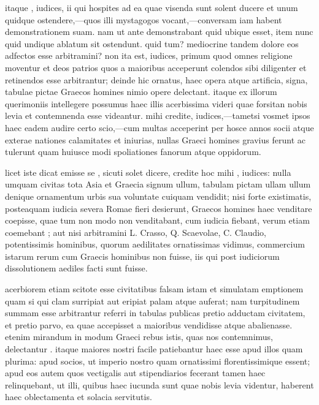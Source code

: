  itaque , iudices, ii qui hospites ad ea quae visenda sunt solent ducere et unum quidque ostendere,—quos illi mystagogos vocant,—conversam iam habent demonstrationem suam. nam ut ante demonstrabant quid ubique esset, item nunc quid undique ablatum sit ostendunt. quid tum? mediocrine tandem dolore eos adfectos esse arbitramini? non ita est, iudices, primum quod omnes religione moventur et deos patrios quos a maioribus acceperunt colendos sibi diligenter et retinendos esse arbitrantur; deinde hic ornatus, haec opera atque artificia, signa, tabulae pictae Graecos homines nimio opere delectant. itaque ex illorum querimoniis intellegere possumus haec illis acerbissima videri quae forsitan nobis levia et contemnenda esse videantur. mihi credite, iudices,—tametsi vosmet ipsos haec eadem audire certo scio,—cum multas acceperint per hosce annos socii atque exterae nationes calamitates et iniurias, nullas Graeci homines gravius ferunt ac tulerunt quam huiusce modi spoliationes fanorum atque oppidorum.

 licet iste dicat emisse se , sicuti solet dicere, credite hoc mihi , iudices: nulla umquam civitas tota Asia et Graecia signum ullum, tabulam pictam ullam ullum denique ornamentum urbis sua voluntate cuiquam vendidit; nisi forte existimatis, posteaquam iudicia severa Romae fieri desierunt, Graecos homines haec venditare coepisse, quae tum non modo non venditabant, cum iudicia fiebant, verum etiam coemebant ; aut nisi arbitramini L. Crasso, Q. Scaevolae, C. Claudio, potentissimis hominibus, quorum aedilitates ornatissimas vidimus, commercium istarum rerum cum Graecis hominibus non fuisse, iis qui post iudiciorum dissolutionem aediles facti sunt fuisse.

 acerbiorem etiam scitote esse civitatibus falsam istam et simulatam emptionem quam si qui clam surripiat aut eripiat palam atque auferat; nam turpitudinem summam esse arbitrantur referri in tabulas publicas pretio adductam civitatem, et pretio parvo, ea quae accepisset a maioribus vendidisse atque abalienasse. etenim mirandum in modum Graeci rebus istis, quas nos contemnimus, delectantur . itaque maiores nostri facile patiebantur haec esse apud illos quam plurima: apud socios, ut imperio nostro quam ornatissimi florentissimique essent; apud eos autem quos vectigalis aut stipendiarios fecerant tamen haec relinquebant, ut illi, quibus haec iucunda sunt quae nobis levia videntur, haberent haec oblectamenta et solacia servitutis.

